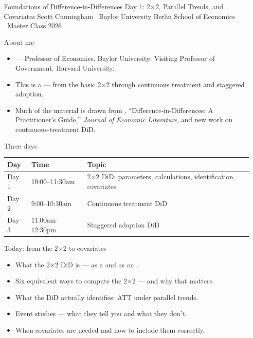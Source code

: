 \documentclass[aspectratio=169,11pt]{beamer}
\begin{document}

\codechellatitle
  {Foundations of Difference-in-Differences}
  {Day 1: 2$\times$2, Parallel Trends, and Covariates}
  {Scott Cunningham \textperiodcentered\ Baylor University}
  {Berlin School of Economics \textperiodcentered\ Master Class 2026}

\begin{frame}{About me}
\vspace{0.4em}
\begin{itemize}\setlength\itemsep{0.6em}
  \item {} --- Professor of Economics, Baylor University; Visiting Professor of Government, Harvard University.
  \item This is a  --- from the basic 2$\times$2 through continuous treatment and staggered adoption.
  \item Much of the material is drawn from , ``Difference-in-Differences: A Practitioner's Guide,'' \textit{Journal of Economic Literature}, and new work on continuous-treatment DiD.
\end{itemize}
\end{frame}

\begin{frame}{Three days}
\vspace{0.4em}
\begin{center}
\renewcommand{\arraystretch}{1.6}
\small
\begin{tabular}{@{}llp{6.8cm}@{}}
\toprule
\textbf{Day} & \textbf{Time} & \textbf{Topic} \\
\midrule
Day 1 & 10:00--11:30am & 2$\times$2 DiD: parameters, calculations, identification, covariates \\
Day 2 & 9:00--10:30am  & Continuous treatment DiD \\
Day 3 & 11:00am--12:30pm & Staggered adoption DiD \\
\bottomrule
\end{tabular}
\end{center}
\end{frame}

\begin{frame}{Today: from the 2$\times$2 to covariates}
\vspace{0.4em}
\begin{itemize}\setlength\itemsep{0.5em}
  \item What the 2$\times$2 DiD is --- as a  and as an .
  \item Six equivalent ways to compute the 2$\times$2 --- and why that matters.
  \item What the DiD actually identifies: ATT under parallel trends.
  \item Event studies --- what they tell you and what they don't.
  \item When covariates are needed and how to include them correctly.
\end{itemize}
\end{frame}
\end{document}
